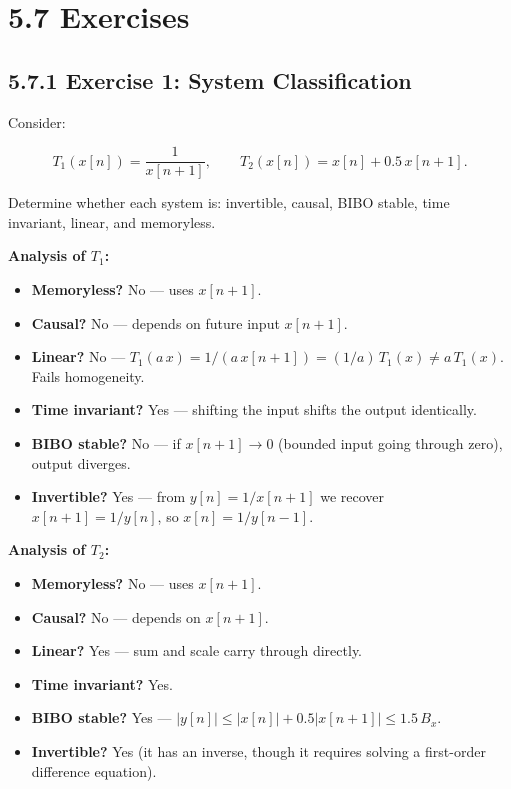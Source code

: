 \documentclass[11pt]{article}
\begin{document}
\section*{5.7 Exercises}

\subsection*{5.7.1 Exercise 1: System Classification}

Consider:

\[T_1(x[n]) = \frac{1}{x[n+1]}, \qquad T_2(x[n]) = x[n] + 0.5\,x[n+1].\]

Determine whether each system is: invertible, causal, BIBO stable, time invariant, linear, and memoryless.

\textbf{Analysis of $T_1$:}

\begin{itemize}
  \item \textbf{Memoryless?} No — uses $x[n+1]$.
  \item \textbf{Causal?} No — depends on future input $x[n+1]$.
  \item \textbf{Linear?} No — $T_1(a\,x) = 1/(a\,x[n+1]) = (1/a)\,T_1(x) \neq a\,T_1(x)$. Fails homogeneity.
  \item \textbf{Time invariant?} Yes — shifting the input shifts the output identically.
  \item \textbf{BIBO stable?} No — if $x[n+1] \to 0$ (bounded input going through zero), output diverges.
  \item \textbf{Invertible?} Yes — from $y[n] = 1/x[n+1]$ we recover $x[n+1] = 1/y[n]$, so $x[n] = 1/y[n-1]$.
\end{itemize}

\textbf{Analysis of $T_2$:}

\begin{itemize}
  \item \textbf{Memoryless?} No — uses $x[n+1]$.
  \item \textbf{Causal?} No — depends on $x[n+1]$.
  \item \textbf{Linear?} Yes — sum and scale carry through directly.
  \item \textbf{Time invariant?} Yes.
  \item \textbf{BIBO stable?} Yes — $|y[n]| \leq |x[n]| + 0.5|x[n+1]| \leq 1.5\,B_x$.
  \item \textbf{Invertible?} Yes (it has an inverse, though it requires solving a first-order difference equation).
\end{itemize}
\end{document}
